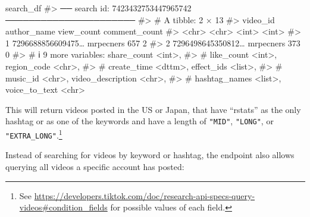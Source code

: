 \documentclass[
  nobib]{ccr}
\newenvironment{Shaded}{\begin{snugshade}}{\end{snugshade}}
\newcommand{\CommentTok}[1]{\textcolor[rgb]{0.37,0.37,0.37}{#1}}
\newcommand{\NormalTok}[1]{\textcolor[rgb]{0.00,0.23,0.31}{#1}}
\begin{document}
\begin{Shaded}
\begin{Highlighting}[]
\NormalTok{search\_df}
\CommentTok{\#\textgreater{} ── search id: 7423432753447965742 ──────────────────────}
\CommentTok{\#\textgreater{} \# A tibble: 2 × 13}
\CommentTok{\#\textgreater{}   video\_id          author\_name view\_count comment\_count}
\CommentTok{\#\textgreater{}   \textless{}chr\textgreater{}             \textless{}chr\textgreater{}            \textless{}int\textgreater{}         \textless{}int\textgreater{}}
\CommentTok{\#\textgreater{} 1 7296688856609475… mrpecners          657             2}
\CommentTok{\#\textgreater{} 2 7296498645350812… mrpecners          373             0}
\CommentTok{\#\textgreater{} \# ℹ 9 more variables: share\_count \textless{}int\textgreater{},}
\CommentTok{\#\textgreater{} \#   like\_count \textless{}int\textgreater{}, region\_code \textless{}chr\textgreater{},}
\CommentTok{\#\textgreater{} \#   create\_time \textless{}dttm\textgreater{}, effect\_ids \textless{}list\textgreater{},}
\CommentTok{\#\textgreater{} \#   music\_id \textless{}chr\textgreater{}, video\_description \textless{}chr\textgreater{},}
\CommentTok{\#\textgreater{} \#   hashtag\_names \textless{}list\textgreater{}, voice\_to\_text \textless{}chr\textgreater{}}
\end{Highlighting}
\end{Shaded}

This will return videos posted in the US or Japan, that have ``rstats''
as the only hashtag or as one of the keywords and have a length of
\texttt{"MID"}, \texttt{"LONG"}, or \texttt{"EXTRA\_LONG"}.\footnote{
  See
  \url{https://developers.tiktok.com/doc/research-api-specs-query-videos\#condition_fields}
  for possible values of each field.}

Instead of searching for videos by keyword or hashtag, the endpoint also
allows querying all videos a specific account has posted:
\end{document}
